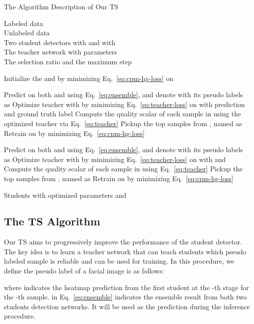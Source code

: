 \documentclass[10pt,twocolumn,letterpaper]{article}
\def\Eqref#1{{Eq.~\eqref{#1}}}
\begin{document}
\begin{algorithm}[t!]
\caption{The Algorithm Description of Our TS}
\label{alg:SSFLD}
\begin{algorithmic}[1]
\Require Labeled data  \\
\hspace{4mm} Unlabeled data  \\
\hspace{4mm} Two student detectors  with  and  with  \\
\hspace{4mm} The teacher network  with parameters  \\
\hspace{4mm} The selection ratio  and the maximum step 

\State Initialize the  and  by minimizing \Eqref{eq:cpm-hg-loss} on 

\For{; ; ++}

  \State Predict  on both  and  using \Eqref{eq:ensemble}, and denote  with its pseudo labels as  
  \State Optimize teacher with  by minimizing \Eqref{eq:teacher-loss} on  with prediction  and ground truth label  
  \State Compute the quality scalar of each sample in  using the optimized teacher via \Eqref{eq:teacher}
  \State Pickup the top  samples from , named as 
  \State Retrain  on  by minimizing \Eqref{eq:cpm-hg-loss}
  
  \State Predict  on both  and  using \Eqref{eq:ensemble}, and denote  with its pseudo labels as  
  \State Optimize teacher with  by minimizing \Eqref{eq:teacher-loss} on  with  and  
  \State Compute the quality scalar of each sample in  using \Eqref{eq:teacher}
  \State Pickup the top  samples from , named as 
  \State Retrain  on  by minimizing \Eqref{eq:cpm-hg-loss}

\EndFor

\Ensure Students with optimized parameters  and 

\end{algorithmic}
\end{algorithm}




\subsection{The TS Algorithm}\label{sec:method-algo}

Our TS aims to progressively improve the performance of the student detector. The key idea is to learn a teacher network that can teach students which pseudo labeled sample is reliable and can be used for training. In this procedure, we define the pseudo label of a facial image is as follows:
{

}\noindent where  indicates the heatmap prediction from the first student at the -th stage for the -th sample.  in \Eqref{eq:ensemble} indicates the ensemble result from both two students detection networks.
It will be used as the prediction during the inference procedure.
\end{document}
